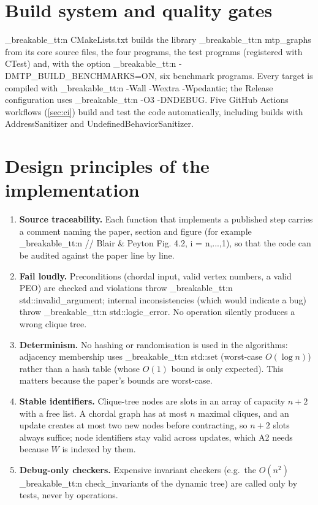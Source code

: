 \documentclass[11pt,a4paper,oneside]{report}
\theoremstyle{plain}
\theoremstyle{definition}
\theoremstyle{remark}
\DeclareRobustCommand{\code}[1]{\mtp_breakable_tt:n {#1}}
\begin{document}
\section{Build system and quality gates}
\code{CMakeLists.txt} builds the library \code{mtp_graphs} from its core source files,
the four programs, the test programs (registered with CTest) and, with the option
\code{-DMTP_BUILD_BENCHMARKS=ON}, six benchmark programs. Every target is compiled with
\code{-Wall -Wextra -Wpedantic}; the Release configuration uses \code{-O3 -DNDEBUG}. Five
GitHub Actions workflows (\cref{sec:ci}) build and test the code automatically, including
builds with AddressSanitizer and UndefinedBehaviorSanitizer.

\section{Design principles of the implementation}
\begin{enumerate}
\item \textbf{Source traceability.} Each function that implements a published step carries a
  comment naming the paper, section and figure (for example
  \code{// Blair & Peyton Fig. 4.2, i = n,...,1}), so that the code can be audited against the
  paper line by line.
\item \textbf{Fail loudly.} Preconditions (chordal input, valid vertex numbers, a valid PEO)
  are checked and violations throw \code{std::invalid_argument}; internal inconsistencies
  (which would indicate a bug) throw \code{std::logic_error}. No operation silently produces a
  wrong clique tree.
\item \textbf{Determinism.} No hashing or randomisation is used in the algorithms: adjacency
  membership uses \code{std::set} (worst-case \(O(\log n)\)) rather than a hash table (whose
  \(O(1)\) bound is only expected). This matters because the paper's bounds are worst-case.
\item \textbf{Stable identifiers.} Clique-tree nodes are slots in an array of capacity \(n+2\)
  with a free list. A chordal graph has at most \(n\) maximal cliques, and an update creates at
  most two new nodes before contracting, so \(n+2\) slots always suffice; node identifiers stay
  valid across updates, which A2 needs because \(W\) is indexed by them.
\item \textbf{Debug-only checkers.} Expensive invariant checkers (e.g.\ the \(O(n^2)\)
  \code{check_invariants} of the dynamic tree) are called only by tests, never by operations.
\end{enumerate}
\end{document}
